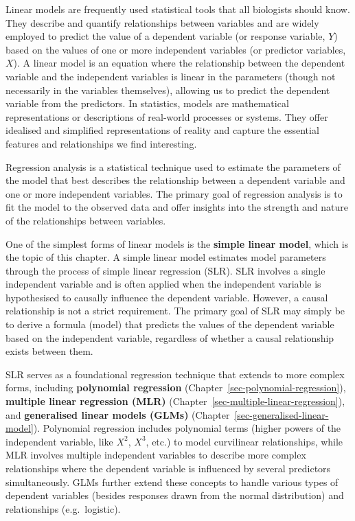 \documentclass[
  letterpaper,
]{book}
\begin{document}
Linear models are frequently used statistical tools that all biologists
should know. They describe and quantify relationships between variables
and are widely employed to predict the value of a dependent variable (or
response variable, \(Y\)) based on the values of one or more independent
variables (or predictor variables, \(X\)). A linear model is an equation
where the relationship between the dependent variable and the
independent variables is linear in the parameters (though not
necessarily in the variables themselves), allowing us to predict the
dependent variable from the predictors. In statistics, models are
mathematical representations or descriptions of real-world processes or
systems. They offer idealised and simplified representations of reality
and capture the essential features and relationships we find
interesting.

Regression analysis is a statistical technique used to estimate the
parameters of the model that best describes the relationship between a
dependent variable and one or more independent variables. The primary
goal of regression analysis is to fit the model to the observed data and
offer insights into the strength and nature of the relationships between
variables.

One of the simplest forms of linear models is the \textbf{simple linear
model}, which is the topic of this chapter. A simple linear model
estimates model parameters through the process of simple linear
regression (SLR). SLR involves a single independent variable and is
often applied when the independent variable is hypothesised to causally
influence the dependent variable. However, a causal relationship is not
a strict requirement. The primary goal of SLR may simply be to derive a
formula (model) that predicts the values of the dependent variable based
on the independent variable, regardless of whether a causal relationship
exists between them.

SLR serves as a foundational regression technique that extends to more
complex forms, including \textbf{polynomial regression}
(Chapter~\ref{sec-polynomial-regression}), \textbf{multiple linear
regression (MLR)} (Chapter~\ref{sec-multiple-linear-regression}), and
\textbf{generalised linear models (GLMs)}
(Chapter~\ref{sec-generalised-linear-model}). Polynomial regression
includes polynomial terms (higher powers of the independent variable,
like \(X^2\), \(X^3\), etc.) to model curvilinear relationships, while
MLR involves multiple independent variables to describe more complex
relationships where the dependent variable is influenced by several
predictors simultaneously. GLMs further extend these concepts to handle
various types of dependent variables (besides responses drawn from the
normal distribution) and relationships (e.g.~logistic).
\end{document}
